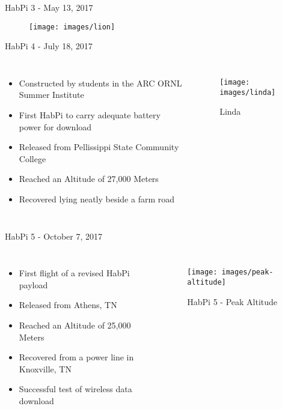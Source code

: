 \documentclass{beamer}
\begin{document}
\begin{frame}{HabPi 3 - May 13, 2017}
    \begin{figure}
        \centering
        \texttt{[image: images/lion]}
    \end{figure}
\end{frame}

\begin{frame}{HabPi 4 - July 18, 2017}
    \begin{columns}[t]
        \begin{itemize}
            \item Constructed by students in the ARC ORNL Summer Institute
	    \item First HabPi to carry adequate battery power for download
	    \item Released from Pellissippi State Community College
            \item Reached an Altitude of 27,000 Meters 
	    \item Recovered lying neatly beside a farm road
        \end{itemize}

        \begin{figure}
            \centering
            \texttt{[image: images/linda]}
            \caption{\tiny Linda}
        \end{figure}
    \end{columns}
\end{frame}

\begin{frame}{HabPi 5 - October 7, 2017}
    \begin{columns}[t]
        \begin{itemize}
            \item First flight of a revised HabPi payload
	    \item Released from Athens, TN
            \item Reached an Altitude of 25,000 Meters 
	    \item Recovered from a power line in Knoxville, TN
	    \item Successful test of wireless data download
        \end{itemize}

        \begin{figure}
            \centering
            \texttt{[image: images/peak-altitude]}
            \caption{\tiny HabPi 5 - Peak Altitude}
        \end{figure}
    \end{columns}
\end{frame}
\end{document}
